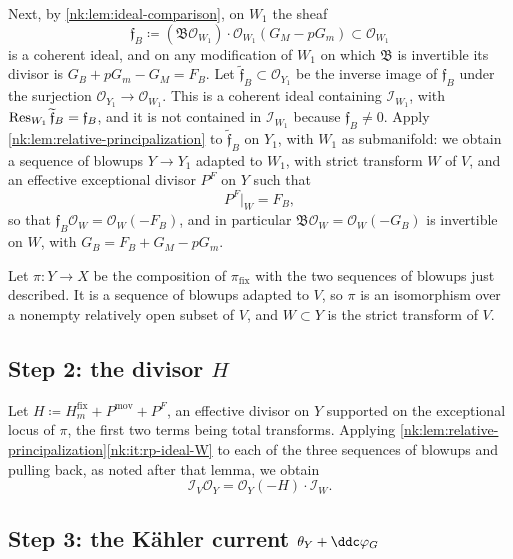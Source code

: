 Next, by \cref{nk:lem:ideal-comparison}, on $W_1$ the sheaf
\[
  \mathfrak f_B\coloneqq (\mathfrak B\mathcal O_{W_1})\cdot\mathcal O_{W_1}(G_M-pG_m)\subset\mathcal O_{W_1}
\]
is a coherent ideal, and on any modification of $W_1$ on which $\mathfrak B$
is invertible its divisor is $G_B+pG_m-G_M=F_B$. Let
$\widetilde{\mathfrak f}_B\subset\mathcal O_{Y_1}$ be the inverse image of $\mathfrak f_B$
under the surjection $\mathcal O_{Y_1}\to\mathcal O_{W_1}$. This is a coherent ideal
containing $\mathcal I_{W_1}$, with $\operatorname{Res}_{W_1}\widetilde{\mathfrak f}_B=\mathfrak f_B$, and it
is not contained in $\mathcal I_{W_1}$ because $\mathfrak f_B\ne0$. Apply
\cref{nk:lem:relative-principalization} to $\widetilde{\mathfrak f}_B$ on $Y_1$,
with $W_1$ as submanifold: we obtain a sequence of blowups
$Y\to Y_1$ adapted to $W_1$, with strict transform $W$ of $V$, and
an effective exceptional divisor $P^F$ on $Y$ such that
\begin{equation}\label{nk:eq:PF-restriction}
  P^F|_W=F_B ,
\end{equation}
so that $\mathfrak f_B\mathcal O_W=\mathcal O_W(-F_B)$, and in particular
$\mathfrak B\mathcal O_W=\mathcal O_W(-G_B)$ is invertible on $W$, with
$G_B=F_B+G_M-pG_m$.

Let $\pi\colon Y\to X$ be the composition of $\pi_{{\mathrm{fix}}}$ with the
two sequences of blowups just described. It is a sequence of blowups
adapted to $V$, so $\pi$ is an isomorphism over a nonempty relatively
open subset of $V$, and $W\subset Y$ is the strict transform of $V$.

\subsection*{Step 2: the divisor \texorpdfstring{$H$}{H}}

Let $H\coloneqq H^{{\mathrm{fix}}}_m+P^{{\mathrm{mov}}}+P^F$,
an effective divisor on $Y$ supported on the exceptional locus of
$\pi$, the first two terms being total transforms. Applying
\cref{nk:lem:relative-principalization}\ref{nk:it:rp-ideal-W} to each of the
three sequences of blowups and pulling back, as noted after that lemma,
we obtain
\begin{equation}\label{nk:eq:IV-H}
  \mathcal I_V\mathcal O_Y=\mathcal O_Y(-H)\cdot\mathcal I_W .
\end{equation}

\subsection*{Step 3: the K\"ahler current \texorpdfstring{$\theta_Y+\ddc\varphi_G$}{on Y}}

